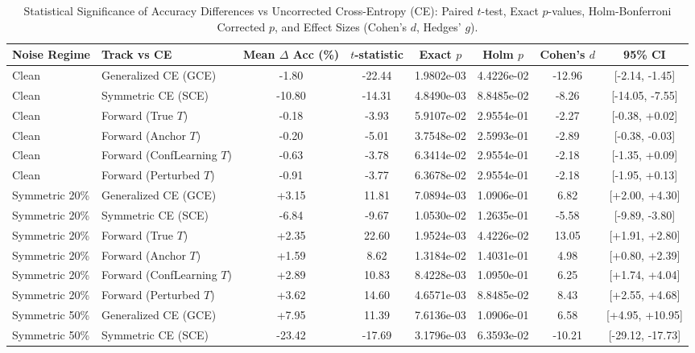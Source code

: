 \begin{table}[t]
\centering
\caption{Statistical Significance of Accuracy Differences vs Uncorrected Cross-Entropy (CE): Paired $t$-test, Exact $p$-values, Holm-Bonferroni Corrected $p$, and Effect Sizes (Cohen's $d$, Hedges' $g$).}
\label{tab:significance}
\small
\begin{tabular}{llcccccc}
\hline
\textbf{Noise Regime} & \textbf{Track vs CE} & \textbf{Mean $\Delta$ Acc (\%)} & \textbf{$t$-statistic} & \textbf{Exact $p$} & \textbf{Holm $p$} & \textbf{Cohen's $d$} & \textbf{95\% CI} \\
\hline
Clean & Generalized CE (GCE) & -1.80 & -22.44 & 1.9802e-03 & 4.4226e-02 & -12.96 & [-2.14, -1.45] \\
Clean & Symmetric CE (SCE) & -10.80 & -14.31 & 4.8490e-03 & 8.8485e-02 & -8.26 & [-14.05, -7.55] \\
Clean & Forward (True $T$) & -0.18 & -3.93 & 5.9107e-02 & 2.9554e-01 & -2.27 & [-0.38, +0.02] \\
Clean & Forward (Anchor $T$) & -0.20 & -5.01 & 3.7548e-02 & 2.5993e-01 & -2.89 & [-0.38, -0.03] \\
Clean & Forward (ConfLearning $T$) & -0.63 & -3.78 & 6.3414e-02 & 2.9554e-01 & -2.18 & [-1.35, +0.09] \\
Clean & Forward (Perturbed $T$) & -0.91 & -3.77 & 6.3678e-02 & 2.9554e-01 & -2.18 & [-1.95, +0.13] \\
Symmetric 20\% & Generalized CE (GCE) & +3.15 & 11.81 & 7.0894e-03 & 1.0906e-01 & 6.82 & [+2.00, +4.30] \\
Symmetric 20\% & Symmetric CE (SCE) & -6.84 & -9.67 & 1.0530e-02 & 1.2635e-01 & -5.58 & [-9.89, -3.80] \\
Symmetric 20\% & Forward (True $T$) & +2.35 & 22.60 & 1.9524e-03 & 4.4226e-02 & 13.05 & [+1.91, +2.80] \\
Symmetric 20\% & Forward (Anchor $T$) & +1.59 & 8.62 & 1.3184e-02 & 1.4031e-01 & 4.98 & [+0.80, +2.39] \\
Symmetric 20\% & Forward (ConfLearning $T$) & +2.89 & 10.83 & 8.4228e-03 & 1.0950e-01 & 6.25 & [+1.74, +4.04] \\
Symmetric 20\% & Forward (Perturbed $T$) & +3.62 & 14.60 & 4.6571e-03 & 8.8485e-02 & 8.43 & [+2.55, +4.68] \\
Symmetric 50\% & Generalized CE (GCE) & +7.95 & 11.39 & 7.6136e-03 & 1.0906e-01 & 6.58 & [+4.95, +10.95] \\
Symmetric 50\% & Symmetric CE (SCE) & -23.42 & -17.69 & 3.1796e-03 & 6.3593e-02 & -10.21 & [-29.12, -17.73] \\

\end{tabular}
\end{table}
